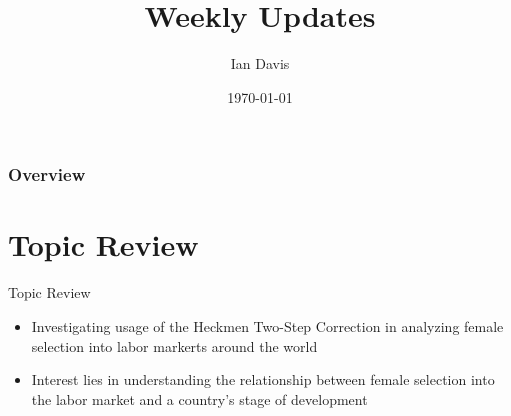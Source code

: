 \documentclass{beamer}
\title[Short title]{Weekly Updates} %
\author{Ian Davis} %
\institute[Clemson University] %
{
Clemson University\\ %
\medskip
}
\date{\today} %
\begin{document}
\begin{frame}
\titlepage %
\end{frame}

\begin{frame}
\frametitle{Overview} %
\tableofcontents %
\end{frame}


\section{Topic Review}
\begin{frame}{Topic Review}
\begin{itemize}
    \item Investigating usage of the Heckmen Two-Step Correction in analyzing female selection into labor markerts around the world
    \item Interest lies in understanding the relationship between female selection into the labor market and a country's stage of development
\end{itemize}
    
\end{frame}
\end{document}
